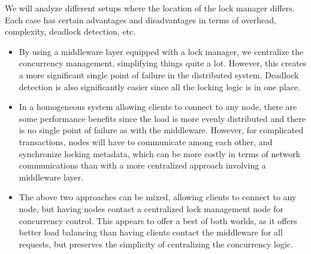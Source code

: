 \documentclass{article}
\begin{document}
We will analyze different setups where the location of the lock manager
differs. Each case has certain advantages and disadvantages in terms of
overhead, complexity, deadlock detection, etc.

\begin{itemize}
    \item
        By using a middleware layer equipped with a lock manager, we centralize
        the concurrency management, simplifying things quite a lot. However,
        this creates a more significant single point of failure in the
        distributed system. Deadlock detection is also significantly easier
        since all the locking logic is in one place.

    \item
        In a homogeneous system allowing clients to connect to any node,
        there are some performance benefits since the load is more evenly
        distributed and there is no single point of failure as with the
        middleware. However, for complicated transactions, nodes will have to
        communicate among each other, and synchronize locking metadata, which
        can be more costly in terms of network communications than with a
        more centralized approach involving a middleware layer.

    \item
        The above two approaches can be mixed, allowing clients to connect to
        any node, but having nodes contact a centralized lock management node
        for concurrency control. This appears to offer a best of both worlds,
        as it offers better load balancing than having clients contact the
        middleware for all requests, but preserves the simplicity of
        centralizing the concurrency logic.
\end{itemize}
\end{document}
